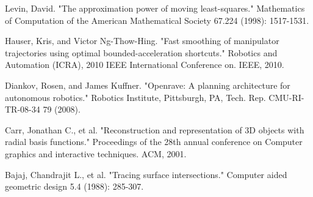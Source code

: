 \documentclass[letterpaper, 10 pt, conference]{ieeeconf}  %
\begin{document}
\begin{thebibliography}{99}
 Levin, David. "The approximation power of moving least-squares." Mathematics of Computation of the American Mathematical Society 67.224 (1998): 1517-1531.

 Hauser, Kris, and Victor Ng-Thow-Hing. "Fast smoothing of
manipulator trajectories using optimal bounded-acceleration shortcuts." Robotics and Automation (ICRA), 2010 IEEE International Conference on. IEEE, 2010.

 Diankov, Rosen, and James Kuffner. "Openrave: A planning
architecture for autonomous robotics." Robotics Institute, Pittsburgh, PA, Tech.
Rep. CMU-RI-TR-08-34 79 (2008).

 Carr, Jonathan C., et al. "Reconstruction and representation of 3D
objects with radial basis functions." Proceedings of the 28th annual conference
on Computer graphics and interactive techniques. ACM, 2001.

 Bajaj, Chandrajit L., et al. "Tracing surface intersections."
Computer aided geometric design 5.4 (1988): 285-307.

\end{thebibliography}
\end{document}
